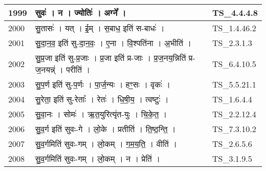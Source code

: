\documentclass[17pt]{extarticle}
\begin{document}
\begin{longtable}{||p{0.4in}||p{4.9in}||p{0.9in}||}
    \hline
        
    1999 & सुवः॑   ।   न   ।   ज्योतिः॑   ।   अग्ने᳚   ।    & TS\_4.4.4.8       \\
    
    \hline
        
    2000 & सु॒तासः॑   ।   यत्   ।   ई॒म्   ।   स॒बाध॒ इति॑ स{-}बाधः॑   ।    & TS\_1.4.46.2       \\
    
    \hline
        
    2001 & सु॒दा॒न॒व॒ इति॑ सु{-}दा॒न॒वः॒   ।   ए॒ना   ।   वि॒श्पति॑ना   ।   अ॒भीति॑   ।    & TS\_2.3.1.3       \\
    
    \hline
        
    2002 & सु॒प्र॒जा इति॑ सु{-}प्र॒जाः   ।   प्र॒जा इति॑ प्र{-}जाः   ।   प्र॒ज॒नय॒न्निति॑ प्र{-}ज॒नयन्न्॑   ।   परीति॑   ।    & TS\_6.4.10.5       \\
    
    \hline
        
    2003 & सु॒प॒र्ण इति॑ सु{-}प॒र्णः   ।   पा॒र्ज॒न्यः   ।   हꣳ॒॒सः   ।   वृकः॑   ।    & TS\_5.5.21.1       \\
    
    \hline
        
    2004 & सु॒रेता॒ इति॑ सु{-}रेताः᳚   ।   रेतः॑   ।   धि॒षी॒य॒   ।   त्वष्टुः॑   ।    & TS\_1.6.4.4       \\
    
    \hline
        
    2005 & सु॒वा॒नः   ।   सोमः॑   ।   ऋ॒त॒युरित्यृ॑त{-}युः   ।   चि॒के॒त॒   ।    & TS\_2.2.12.4       \\
    
    \hline
        
    2006 & सु॒व॒र्ग इति॑ सुवः{-}गे   ।   लो॒के   ।   प्रतीति॑   ।   ति॒ष्ठ॒न्ति॒   ।    & TS\_7.3.10.2       \\
    
    \hline
        
    2007 & सु॒व॒र्गमिति॑ सुवः{-}गम्   ।   लो॒कम्   ।   ग॒म॒य॒ति॒   ।   वीति॑   ।    & TS\_2.6.5.6       \\
    
    \hline
        
    2008 & सु॒व॒र्गमिति॑ सुवः{-}गम्   ।   लो॒कम्   ।   न   ।   प्रेति॑   ।    & TS\_3.1.9.5       \\
    
    \hline
        

\end{longtable}
\end{document}
